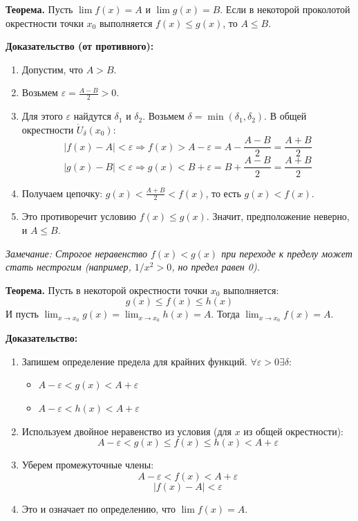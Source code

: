 \textbf{Теорема.} Пусть $\lim f(x) = A$ и $\lim g(x) = B$.
Если в некоторой проколотой окрестности точки $x_0$ выполняется $f(x) \leq g(x)$, то $A \leq B$.
	
\begin{tcolorbox}[title=3. Предельный переход в неравенствах]
	\textbf{Доказательство (от противного):}
	\begin{enumerate}
		\item Допустим, что $A > B$.
		\item Возьмем $\varepsilon = \frac{A - B}{2} > 0$.
		\item Для этого $\varepsilon$ найдутся $\delta_1$ и $\delta_2$. Возьмем $\delta = \min(\delta_1, \delta_2)$. В общей окрестности $\mathring{U}_\delta(x_0)$:
		$$ |f(x) - A| < \varepsilon \Rightarrow f(x) > A - \varepsilon = A - \frac{A-B}{2} = \frac{A+B}{2} $$
		$$ |g(x) - B| < \varepsilon \Rightarrow g(x) < B + \varepsilon = B + \frac{A-B}{2} = \frac{A+B}{2} $$
		\item Получаем цепочку: $g(x) < \frac{A+B}{2} < f(x)$, то есть $g(x) < f(x)$.
		\item Это противоречит условию $f(x) \leq g(x)$. Значит, предположение неверно, и $A \leq B$.
	\end{enumerate}
	\textit{Замечание: Строгое неравенство $f(x) < g(x)$ при переходе к пределу может стать нестрогим (например, $1/x^2 > 0$, но предел равен 0).}
\end{tcolorbox}

\textbf{Теорема.} Пусть в некоторой окрестности точки $x_0$ выполняется:
$$ g(x) \leq f(x) \leq h(x) $$
И пусть $\lim_{x\to x_0} g(x) = \lim_{x\to x_0} h(x) = A$.
Тогда $\lim_{x\to x_0} f(x) = A$.
\begin{tcolorbox}[title=4. Теорема о зажатой функции (о двух милиционерах)]	
	\textbf{Доказательство:}
	\begin{enumerate}
		\item Запишем определение предела для крайних функций. $\forall \varepsilon > 0 \exists \delta$:
		\begin{itemize}
			\item $A - \varepsilon < g(x) < A + \varepsilon$
			\item $A - \varepsilon < h(x) < A + \varepsilon$
		\end{itemize}
		\item Используем двойное неравенство из условия (для $x$ из общей окрестности):
		$$ A - \varepsilon < g(x) \leq f(x) \leq h(x) < A + \varepsilon $$
		\item Уберем промежуточные члены:
		$$ A - \varepsilon < f(x) < A + \varepsilon $$
		$$ |f(x) - A| < \varepsilon $$
		\item Это и означает по определению, что $\lim f(x) = A$.
	\end{enumerate}
\end{tcolorbox}
